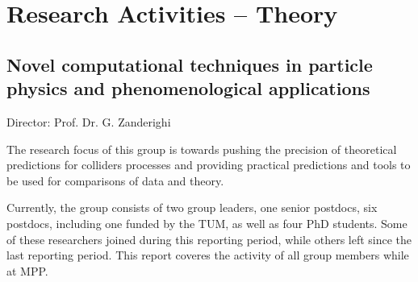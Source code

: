 \documentclass{FBR_Bericht_2025}
\begin{document}
\onecolumn
{}
\tableofcontents
\cleardoublepage

\twocolumn

\chapter{Research Activities -- Theory}
\section[Novel computational techniques in particle physics and phenomenological applications]{Novel computational techniques in particle physics and phenomenological applications}
\begin{Namen}
Director: Prof. Dr. G. Zanderighi
\end{Namen}

The research focus of this group is towards pushing the precision of
theoretical predictions for colliders processes and providing
practical predictions and tools to be used for comparisons of data and
theory.

Currently, the group consists of two group leaders, one senior
postdocs, six postdocs, including one funded by the TUM, as well as
four PhD students. Some of these researchers joined during this
reporting period, while others left since the last reporting
period. This report coveres the activity of all group members while at
MPP. 


\end{document}
